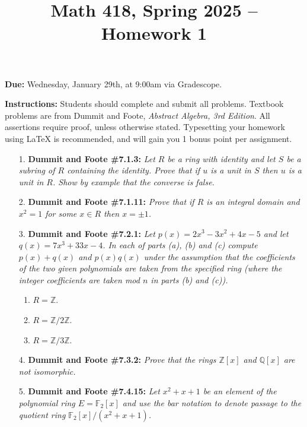 \documentclass[12pt]{article}
\title{Math 418, Spring 2025 -- Homework 1}
\date{}
\newcommand{\Z}{\mathbb{Z}}
\newcommand{\Q}{\mathbb{Q}}
\newcommand{\F}{\mathbb{F}}
\begin{document}
 \maketitle
\vspace{-80pt}

\textbf{Due:} Wednesday, January 29th, at 9:00am via Gradescope.

\textbf{Instructions:} Students should complete and submit all problems. Textbook problems are from Dummit and Foote, \emph{Abstract Algebra, 3rd Edition}. All assertions require proof, unless otherwise stated. Typesetting your homework using LaTeX is recommended, and will gain you 1 bonus point per assignment.

\begin{enumerate}

\item[1.] \textbf{Dummit and Foote \#7.1.3:} \textit{Let $R$ be a ring with identity and let $S$ be a subring of $R$ containing the identity. Prove that if $u$ is a unit in $S$ then $u$ is a unit in $R$. Show by example that the converse is false.}

\item[2.] \textbf{Dummit and Foote \#7.1.11:} \textit{Prove that if $R$ is an integral domain and $x^2 = 1$ for some $x\in R$ then $x = \pm 1$.}

\item[3.] \textbf{Dummit and Foote \#7.2.1:} \textit{Let $p(x) = 2x^3 - 3x^2 + 4x - 5$ and let $q(x) = 7x^3 + 33x - 4$. In each of parts (a), (b) and (c) compute $p(x) + q (x)$ and $p(x)q(x)$ under the assumption that the coefficients of the two given polynomials are taken from the specified ring (where the integer coefficients are taken mod $n$ in parts (b) and (c)).}

\begin{enumerate}
    \item $R=\Z$.

    \item $R = \Z/2\Z$.
    
    \item $R = \Z/3\Z$.
    
\end{enumerate}

\item[4.] \textbf{Dummit and Foote \#7.3.2:} \textit{Prove that the rings $\Z[x]$ and $\Q[x]$ are not isomorphic.}

\item[5.] \textbf{Dummit and Foote \#7.4.15:} \textit{Let $x^2 + x + 1$ be an element of the polynomial ring $E = \F_2[x]$ and use the bar notation to denote passage to the quotient ring $\F_2[x]/(x^2+x+1)$.}


\end{enumerate}
\end{document}
